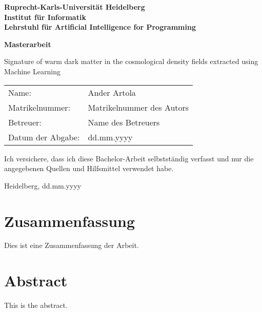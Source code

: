 \documentclass[
     12pt,                    %
     a4paper,             %
     BCOR=10mm,     %
     DIV=14,                 %
     listof=totoc,                    %
     bibliography=totoc,       %
     index=totoc,              %
     twoside,
     headsepline
     ]{scrreprt}
\begin{document}
\begin{titlepage}


\vspace*{1cm}
\begin{center}
\vspace*{3cm}
\textbf{ 
\Large Ruprecht-Karls-Universität Heidelberg\\
\smallskip
\Large Institut für Informatik\\
\smallskip
\Large Lehrstuhl für Artificial Intelligence for Programming\\
\smallskip
}

\vspace{3cm}

\textbf{\large Masterarbeit} %

\vspace{0.5\baselineskip}
{\huge
Signature of warm dark matter in the
cosmological density fields extracted using
Machine Learning
}
\end{center}

\vfill 

{\large
\begin{tabular}[l]{ll}
Name: & Ander Artola\\
Matrikelnummer: & Matrikelnummer des Autors\\
Betreuer: & Name des Betreuers\\
Datum der Abgabe: & dd.mm.yyyy
\end{tabular}
}

\end{titlepage}

\onehalfspacing

\thispagestyle{empty}

\vspace*{100pt}
\noindent
Ich versichere, dass ich diese Bachelor-Arbeit selbstständig verfasst und nur die angegebenen
Quellen und Hilfsmittel verwendet habe.

\vspace*{50pt}

\noindent
Heidelberg, dd.mm.yyyy
\cleardoublepage

\section*{Zusammenfassung}

Dies ist eine Zusammenfassung der Arbeit.

\section*{Abstract}

This is the abstract.

\cleardoublepage

\tableofcontents
\cleardoublepage
{} 


\cleardoublepage












\printbibliography
\end{document}
